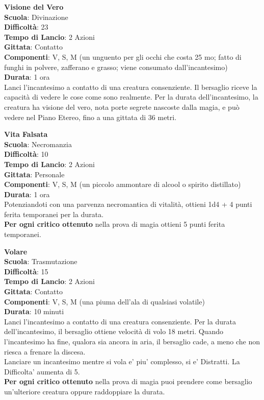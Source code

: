 \begin{multicols}{2}
\medskip\textbf{Visione del Vero}\\
\textbf{Scuola}: Divinazione\\
\textbf{Difficoltà}:  23\\
\textbf{Tempo di Lancio}: 2 Azioni\\
\textbf{Gittata}: Contatto\\
\textbf{Componenti}: V, S, M (un unguento per gli occhi che costa 25 mo; fatto di funghi in polvere, zafferano e grasso; viene consumato dall'incantesimo)\\
\textbf{Durata}: 1 ora\\
Lanci l'incantesimo a contatto di una creatura consenziente. Il bersaglio riceve la capacità di vedere le cose come sono realmente. Per la durata dell'incantesimo, la creatura ha visione del vero, nota porte segrete nascoste dalla magia, e può vedere nel Piano Etereo, fino a una gittata di 36 metri.

\medskip\textbf{Vita Falsata}\\
\textbf{Scuola}: Necromanzia\\
\textbf{Difficoltà}:  10\\
\textbf{Tempo di Lancio}: 2 Azioni\\
\textbf{Gittata}: Personale\\
\textbf{Componenti}: V, S, M (un piccolo ammontare di alcool o spirito distillato)\\
\textbf{Durata}: 1 ora\\
Potenziandoti con una parvenza necromantica di vitalità, ottieni 1d4 + 4 punti ferita temporanei per la durata.\\
\textbf{Per ogni critico ottenuto} nella prova di magia ottieni 5 punti ferita temporanei.

\medskip\textbf{Volare}\\
\textbf{Scuola}: Trasmutazione\\
\textbf{Difficoltà}:  15\\
\textbf{Tempo di Lancio}: 2 Azioni\\
\textbf{Gittata}: Contatto\\
\textbf{Componenti}: V, S, M (una piuma dell'ala di qualsiasi volatile)\\
\textbf{Durata}: 10 minuti \\
Lanci l'incantesimo a contatto di una creatura consenziente. Per la durata dell'incantesimo, il bersaglio ottiene velocità di volo 18 metri. Quando l'incantesimo ha fine, qualora sia ancora in aria, il bersaglio cade, a meno che non riesca a frenare la discesa.\\
Lanciare un incantesimo mentre si vola e' piu' complesso, si e' Distratti. La Difficolta' aumenta di 5.\\
\textbf{Per ogni critico ottenuto} nella prova di magia puoi prendere come bersaglio un'ulteriore creatura oppure raddoppiare la durata.


\end{multicols}
